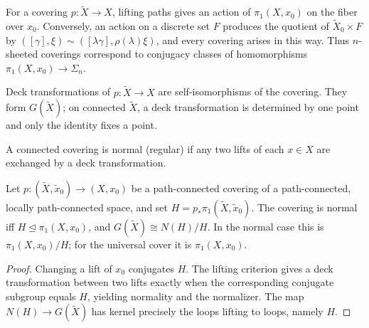 For a covering $p:\widetilde X\to X$, lifting paths gives an action of
$\pi_1(X,x_0)$ on the fiber over $x_0$. Conversely, an action on a discrete set
$F$ produces the quotient of $\widetilde X_0\times F$ by
$([\gamma],\xi)\sim([\lambda\gamma],\rho(\lambda)\xi)$, and every covering
arises in this way. Thus $n$-sheeted coverings correspond to conjugacy classes
of homomorphisms $\pi_1(X,x_0)\to\Sigma_n$.

\begin{definition}
\label{def:deck-transformation-group}


Deck transformations of $p:\widetilde X\to X$ are self-isomorphisms of the
covering. They form $G(\widetilde X)$; on connected $\widetilde X$, a deck
transformation is determined by one point and only the identity fixes a point.
\end{definition}

\begin{definition}
\label{def:normal-covering-space}


A connected covering is normal (regular) if any two lifts of each $x\in X$
are exchanged by a deck transformation.
\end{definition}

\begin{proposition}
\label{prop:normal-covering-deck-group}



Let $p:(\widetilde X,\widetilde x_0)\to(X,x_0)$ be a path-connected covering
of a path-connected, locally path-connected space, and set
$H=p_*\pi_1(\widetilde X,\widetilde x_0)$. The covering is normal iff
$H\trianglelefteq\pi_1(X,x_0)$, and
$G(\widetilde X)\cong N(H)/H$. In the normal case this is
$\pi_1(X,x_0)/H$; for the universal cover it is $\pi_1(X,x_0)$.
\end{proposition}

\begin{proof}
\sketch Changing a lift of $x_0$ conjugates $H$. The lifting criterion gives
a deck transformation between two lifts exactly when the corresponding
conjugate subgroup equals $H$, yielding normality and the normalizer. The map
$N(H)\to G(\widetilde X)$ has kernel precisely the loops lifting to loops,
namely $H$.
\end{proof}

